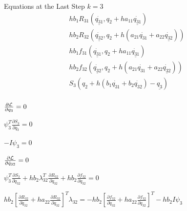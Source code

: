 \documentclass{beamer}
\newcommand{\pd}[2]{\frac{\partial #1}{\partial #2}}
\begin{document}
\begin{frame}[allowframebreaks]
  \framebreak

  \begin{block}{Equations at the Last Step $k=3$}
    \begin{eqnarray}\nonumber
      h b_1 R_{31}\left( \underline{\dot{q_{31}}}, q_2 + h a_{11} \underline{\dot{q_{31}}}  \right)\\ \nonumber
      h b_2 R_{32}( \underline{\dot{q_{32}}}, q_2 + h (a_{21} \dot{q_{31}} + a_{22} \underline{\dot{q_{32}}}) )\\ \nonumber
      h b_1 f_{31}\left( \underline{\dot{q_{31}}}, q_2 + h a_{11} \underline{\dot{q_{31}}}  \right)\\ \nonumber
      h b_2 f_{32}( \underline{\dot{q_{32}}}, q_2 + h (a_{21} \dot{q_{31}} + a_{22} \underline{\dot{q_{32}}}) )\\ \nonumber
      S_3(q_2 + h ( b_1\dot{q_{31}} + b_2\dot{q_{32}} ) - \underline{q_3})\\\nonumber
    \end{eqnarray}
  \end{block}

  \framebreak

  \begin{block}{}\centering
    $ \pd{{\cal L}}{q_3} = 0 $
  \end{block}

  \begin{block}{}\centering
    $ \psi_3^T \pd{S_3}{q_3} = 0 $
  \end{block}

  \begin{block}{}\centering
    $ -{I} \psi_3 = 0$
  \end{block}

  \framebreak

  \begin{block}{}\centering
    $\pd{{\cal L}}{\dot{q}_{32}}=0 $
  \end{block}
  \begin{block}{}\centering
    $ \psi_3^T \pd{S_3}{\dot{q}_{32}} 
      + hb_2\lambda_{32}^T \pd{R_{32}}{\dot{q}_{32}} 
      + hb_2\pd{f_{32}}{\dot{q}_{32}} = 0 $
  \end{block}
  \begin{block}{}\centering
    $ hb_2\left[ \pd{R_{32}}{\dot{q}_{32}} + ha_{22}  \pd{R_{32}}{{q}_{32}} \right]^T\lambda_{32} = 
      - hb_2\left[ \pd{f_{32}}{\dot{q}_{32}} + ha_{22}  \pd{f_{32}}{{q}_{32}} \right]^T 
      - hb_2I \psi_3 $
  \end{block}


\end{frame}
\end{document}
